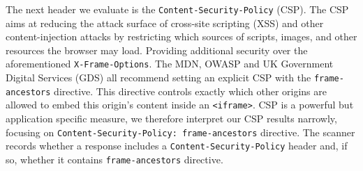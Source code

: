 \documentclass[pdflatex,sn-mathphys-num]{sn-jnl}
\numberwithin{equation}{section}
\theoremstyle{thmstyleone}
\theoremstyle{thmstyletwo}%
\theoremstyle{thmstylethree}%
\begin{document}

\vspace{1em}The next header we evaluate is the \texttt{Content-Security-Policy} (CSP). The CSP aims at reducing the 
attack surface of cross-site scripting (XSS) and other content-injection attacks by restricting which 
sources of scripts, images, and 
other resources the browser may load. Providing additional security over the aforementioned 
\texttt{X-Frame-Options}.
The MDN, OWASP and UK Government Digital Services (GDS) all recommend setting an 
explicit CSP 
\cite{mdn_csp_guide, owasp_csp_cheatsheet,gds_security_overview_websites, owasp_clickjacking_defense} with 
the \texttt{frame-ancestors} directive. This directive controls exactly which other origins are 
allowed to embed this origin's content inside an \texttt{<iframe>}.
CSP is a powerful but application specific measure, we therefore interpret our CSP results narrowly, 
focusing on \texttt{Content-Security-Policy: frame-ancestors} directive.
The scanner records whether a response includes a \texttt{Content-Security-Policy} header and, if so, 
whether it contains \texttt{frame-ancestors} directive.
\end{document}
